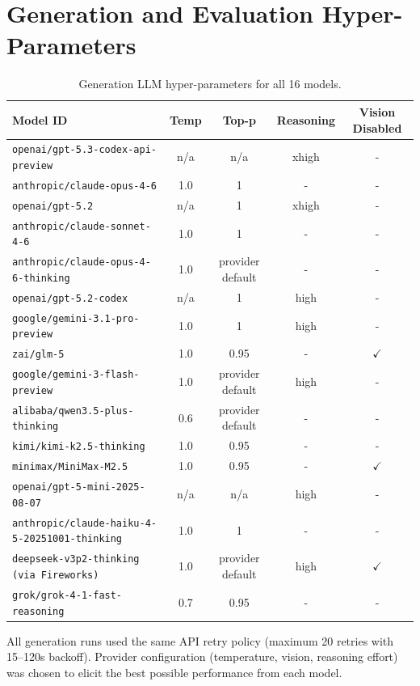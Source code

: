 \section{Generation and Evaluation Hyper-Parameters}
\label{hyperparams}
\begin{table}[!h]
\caption{Generation LLM hyper-parameters for all 16 models.}
\label{tab:generation_hparams_ranked}
\small
\begin{tabular}{@{}p{6.0cm} c c c c@{}}
\toprule
\textbf{Model ID} & \textbf{Temp} & \textbf{Top-p} & \textbf{Reasoning} & \textbf{Vision Disabled} \\
\midrule
\texttt{openai/gpt-5.3-codex-api-preview} & n/a & n/a & xhigh & - \\
\texttt{anthropic/claude-opus-4-6} & 1.0 & 1 & - & - \\
\texttt{openai/gpt-5.2} & n/a & 1 & xhigh & - \\
\texttt{anthropic/claude-sonnet-4-6} & 1.0 & 1 & - & - \\
\texttt{anthropic/claude-opus-4-6-thinking} & 1.0 & provider default & - & - \\
\texttt{openai/gpt-5.2-codex} & n/a & 1 & high & - \\
\texttt{google/gemini-3.1-pro-preview} & 1.0 & 1 & high & - \\
\texttt{zai/glm-5} & 1.0 & 0.95 & - & $\checkmark$ \\
\texttt{google/gemini-3-flash-preview} & 1.0 & provider default & high & - \\
\texttt{alibaba/qwen3.5-plus-thinking} & 0.6 & provider default & - & - \\
\texttt{kimi/kimi-k2.5-thinking} & 1.0 & 0.95 & - & - \\
\texttt{minimax/MiniMax-M2.5} & 1.0 & 0.95 & - & $\checkmark$ \\
\texttt{openai/gpt-5-mini-2025-08-07} & n/a & n/a & high & - \\
\texttt{anthropic/claude-haiku-4-5-20251001-thinking} & 1.0 & 1 & - & - \\
\texttt{deepseek-v3p2-thinking (via Fireworks)} & 1.0 & provider default & high & $\checkmark$ \\
\texttt{grok/grok-4-1-fast-reasoning} & 0.7 & 0.95 & - & - \\
\bottomrule
\end{tabular}
\end{table}

All generation runs used the same API retry policy (maximum 20 retries with 15--120s backoff). Provider configuration (temperature, vision, reasoning effort) was chosen to elicit the best possible performance from each model.


